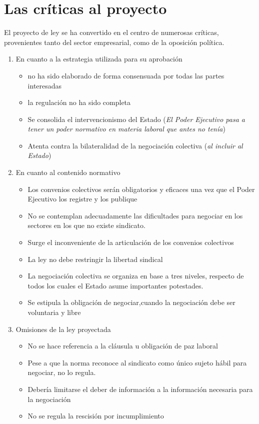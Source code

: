 \documentclass[spanish,12pt,a4paper,titlepage]{report}
\begin{document}
\section{Las críticas al proyecto}
El proyecto de ley se ha convertido en el centro de numerosas críticas, provenientes tanto del sector empresarial, como de la oposición política. 
\begin{enumerate}
\item En cuanto a la estrategia utilizada para su aprobación
\begin{itemize}
\item no ha sido elaborado de forma consensuada por todas las partes interesadas
\item la regulación no ha sido completa
\item Se consolida el intervencionismo del Estado (\textit{El Poder Ejecutivo pasa a 
tener un poder normativo en materia laboral que antes no tenía})
\item Atenta contra la bilateralidad de la negociación colectiva (\textit{al incluir al Estado})
\end{itemize}

\item En cuanto al contenido normativo

\begin{itemize}
\item Los convenios colectivos serán obligatorios y eficaces una vez que el Poder Ejecutivo los registre y los publique
\item No se contemplan adecuadamente las dificultades para negociar en los sectores en los que no existe sindicato.
\item Surge el inconveniente de la articulación de los convenios colectivos
\item La ley no debe restringir la libertad sindical
\item La negociación colectiva se organiza en base a tres niveles, respecto de todos los cuales el Estado asume importantes potestades.
\item  Se estipula la obligación de negociar,cuando la negociación debe ser voluntaria y libre
\end{itemize}
\item Omisiones de la ley proyectada

\begin{itemize}
\item No se hace referencia a la cláusula u obligación de paz laboral
\item Pese a que la norma reconoce al sindicato como único sujeto hábil para negociar, no lo regula.
\item Debería limitarse el deber de información a la información necesaria para la negociación
\item No se regula la rescisión por incumplimiento


\end{itemize}
\end{enumerate}
\end{document}
